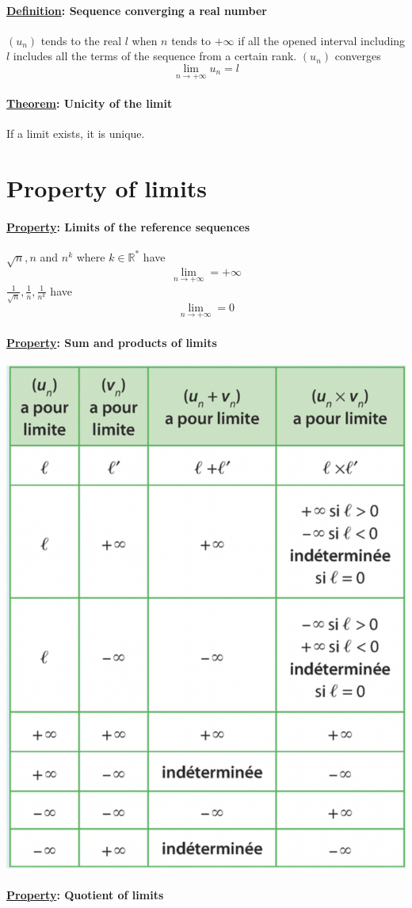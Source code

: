 \documentclass{article}
\newcommand{\definition}[1]{\paragraph*{\underline{Definition}: #1}}
\newcommand{\property}[1]{\paragraph*{\underline{Property}: #1}}
\newcommand{\theorem}[1]{\paragraph*{\underline{Theorem}: #1}}
\begin{document}
\definition{Sequence converging a real number}
$(u_n)$ tends to the real $l$ when $n$ tends to $+\infty$ if all the opened interval including $l$ includes all the terms of the sequence from a certain rank. $(u_n)$ converges $$\lim_{n \to +\infty} u_n = l$$

\theorem{Unicity of the limit}
If a limit exists, it is unique.

\section{Property of limits}
\property{Limits of the reference sequences}
$\sqrt{n}, n$ and $n^k$ where $k \in \mathbb{R}^*$ have 
$$\lim_{n \to +\infty} = +\infty$$
$\frac{1}{\sqrt{n}}, \frac{1}{n}, \frac{1}{n^k}$ have $$\lim_{n \to +\infty} = 0$$
\property{Sum and products of limits}
\begin{center}
    \includegraphics[scale=0.35]{sum_product_table.png}
\end{center}
\property{Quotient of limits}
\end{document}
